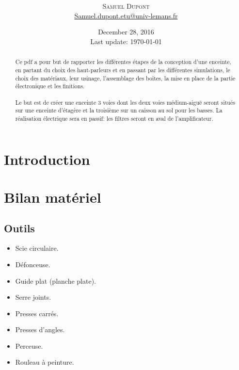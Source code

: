 \documentclass[a4paper,english]{report}
\title{				\fbox{\parbox{0.8\textwidth }{\centering Réalisation d'une enceinte\\ 2}}\\ } %
\author{%
			\textsc{Samuel Dupont}\\ %
			\normalsize \href{mailto:Samuel.dupont.etu@univ-lemans.fr}{Samuel.dupont.etu@univ-lemans.fr } 
		}
\date{December 28, 2016 \\ Last update: \today}
\makeatletter
\newcommand{\frontmatter}{\let\ps@plain\ps@empty\pagestyle{empty}}
\makeatother
\begin{document}
			\maketitle
			\frontmatter %

				\begin{abstract}
					\noindent 
					
				Ce pdf a pour but de rapporter les différentes étapes de la conception d'une enceinte, en partant du choix des haut-parleurs et en passant par les différentes simulations, le choix des matériaux, leur usinage, l'assemblage des boites, la mise en place de  la partie électronique et les finitions.\\ \\
				Le but est de créer une enceinte 3 voies dont les deux voies médium-aiguë seront situés sur une enceinte d'étagère et la troisième sur un caisson au sol pour les basses. La réalisation électrique sera en passif: les filtres seront en aval de l'amplificateur.
				\end{abstract}
			

			
			\chapter{Introduction}
			
			\chapter{Bilan matériel}
			\section{Outils}
			\begin{itemize}
				\item Scie circulaire.
				\item Défonceuse.
				\item Guide plat (planche plate).
				\item Serre joints.
				\item Presses carrés.
				\item Presses d'angles.
				\item Perceuse.
				\item Rouleau à peinture.
			\end{itemize}
			
\end{document}
